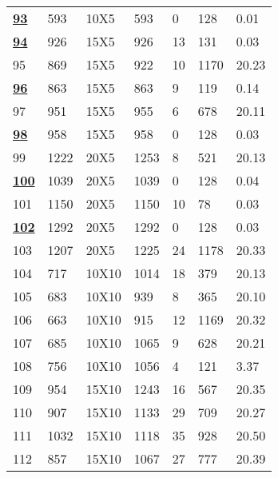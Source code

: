 \documentclass[14pt]{acmsiggraph}
\begin{document}
\begin{table}[h!]
\begin{center}
{\begin{tabular}{||lllllll}
					\underline{\textbf{93}}  & 593  & 10X5   & \cellcolor[rgb]{0.43,0.67,0.27}593  & 0   & 128  & 0.01  \\
					\underline{\textbf{94}}  & 926  & 15X5   & \cellcolor[rgb]{0.43,0.67,0.27}926  & 13  & 131  & 0.03  \\
					95  & 869  & 15X5   & \cellcolor[rgb]{0.5,0.7,0.3}922     & 10  & 1170 & 20.23 \\
					\underline{\textbf{96}}  & 863  & 15X5   & \cellcolor[rgb]{0.43,0.67,0.27}863  & 9   & 119  & 0.14  \\
					97  & 951  & 15X5   & \cellcolor[rgb]{0.44,0.67,0.27}955  & 6   & 678  & 20.11 \\
					\underline{\textbf{98}}  & 958  & 15X5   & \cellcolor[rgb]{0.43,0.67,0.27}958  & 0   & 128  & 0.03  \\
					99  & 1222 & 20X5   & \cellcolor[rgb]{0.46,0.69,0.29}1253 & 8   & 521  & 20.13 \\
					\underline{\textbf{100}} & 1039 & 20X5   & \cellcolor[rgb]{0.43,0.67,0.27}1039 & 0   & 128  & 0.04  \\
					101 & 1150 & 20X5   & \cellcolor[rgb]{0.43,0.67,0.27}1150 & 10  & 78   & 0.03  \\
				\underline{\textbf{102}} & 1292 & 20X5   & \cellcolor[rgb]{0.43,0.67,0.27}1292 & 0   & 128  & 0.03  \\
					103 & 1207 & 20X5   & \cellcolor[rgb]{0.45,0.68,0.28}1225 & 24  & 1178 & 20.33 \\
					104 & 717  & 10X10  & \cellcolor[rgb]{0.9,0.87,0.47}1014  & 18  & 379  & 20.13 \\
					105 & 683  & 10X10  & \cellcolor[rgb]{0.85,0.85,0.45}939  & 8   & 365  & 20.10 \\
					106 & 663  & 10X10  & \cellcolor[rgb]{0.86,0.86,0.45}915  & 12  & 1169 & 20.32 \\
					107 & 685  & 10X10  & \cellcolor[rgb]{1,0.82,0.46}1065    & 9   & 628  & 20.21 \\
					108 & 756  & 10X10  & \cellcolor[rgb]{0.88,0.87,0.46}1056 & 4   & 121  & 3.37  \\
					109 & 954  & 15X10  & \cellcolor[rgb]{0.77,0.82,0.41}1243 & 16  & 567  & 20.35 \\
					110 & 907  & 15X10  & \cellcolor[rgb]{0.71,0.79,0.39}1133 & 29  & 709  & 20.27 \\
					111 & 1032 & 15X10  & \cellcolor[rgb]{0.52,0.71,0.31}1118 & 35  & 928  & 20.50 \\
					112 & 857  & 15X10  & \cellcolor[rgb]{0.71,0.79,0.39}1067 & 27  & 777  & 20.39 \\

\end{tabular}}
\end{center}
\end{table}
\end{document}
